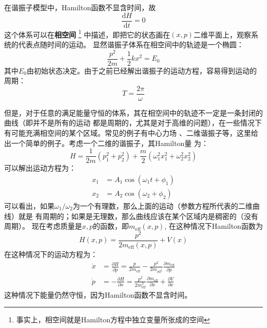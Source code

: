     \par 
    在谐振子模型中，Hamilton函数不显含时间，故
    \begin{equation}
        \frac {\mathrm{d}H}{\mathrm{d}t} = 0
    \end{equation}
    这个体系可以在\textbf{相空间}
    \footnote{事实上，相空间就是Hamilton方程中独立变量所张成的空间}
    中描述，即把它的状态画在$(x,p)$二维平面上，观察系统的代表点随时间的运动。
    显然谐振子体系在相空间中的轨迹是一个椭圆：
    \begin{equation}
        \frac{p^2}{2m} + \frac 12 kx^2 = E_0
    \end{equation}
    其中$E_0$由初始状态决定。由于之前已经解出谐振子的运动方程，容易得到运动的周期：
    \begin{equation}
        T = \frac{2\pi}{\omega}
    \end{equation}
    \par 
    但是，对于任意的满足能量守恒的体系，其在相空间中的轨迹不一定是一条封闭的曲线（即并不是所有的运动
    都是周期的，尤其是对于高维的问题），在一些情况下有可能充满相空间的某个区域。常见的例子有中心力场
    \cite{Landau2007mechanics}、二维谐振子等\cite{B2006经典力学的数学方法}，这里给出一个简单的例子。考虑一个二维的谐振子，其Hamilton量
    为：
    \begin{equation}
        H = \frac{1}{2m}(p_1^2 + p_2^2) + \frac{m}{2}(\omega_1^2x_1^2 + \omega_2^2x_2^2)
    \end{equation}
    可以解出运动方程为：
    \begin{equation}
        \begin{split}
            x_1 &= A_1\cos(\omega_1 t + \phi_1)\\
            x_2 &= A_2\cos(\omega_2 + \phi_2)
        \end{split}
    \end{equation}
    可以看出，如果$\omega_1 / \omega_2$为一个有理数，那么上面的运动（参数方程所代表的二维曲线）就是
    有周期的；如果是无理数，那么曲线应该在某个区域内是稠密的（没有周期）。
    现在考虑质量是$x,p$的函数，即$m_\mathrm{eff}(x,p)$, 在这种情况下Hamilton函数为
    \begin{equation}
        H(x,p) = \frac {p^2}{2m_\mathrm{eff}(x,p)} + V(x)
    \end{equation}
    在这种情况下的运动方程为：
    \begin{equation}
        \begin{split}
            \dot{x} &= \frac {\partial H}{\partial p} = \frac {p}{2m_{\mathrm{eff}}} - \frac {p^2}{2m_{\mathrm{eff}^2}} \frac {\partial m_\mathrm{eff}}{\partial p} \\
            \dot{p} &= -\frac {\partial H}{\partial x} = \frac {p^2}{2m_\mathrm{eff}^2} \frac {\partial m_\mathrm{eff}}{\partial x} + \frac {\partial V}{\partial x}
        \end{split}
    \end{equation}
    这种情况下能量仍然守恒，因为Hamilton函数不显含时间。
